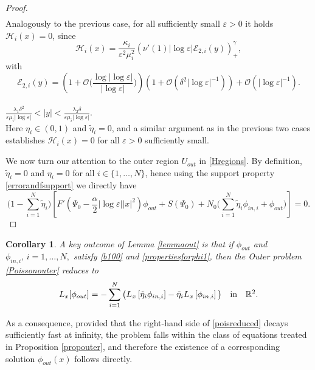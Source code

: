 \documentclass[11pt,reqno,a4paper]{amsart}
\numberwithin{equation}{section}
\newcommand{\R}{\mathbb{R}}
\newcommand{\ve}{\varepsilon}
\newtheorem{corollary}{Corollary}[section]
\begin{document}
\begin{proof}
\begin{equation*}
\begin{aligned}
\end{aligned}
\end{equation*}
 Analogously to the previous case, for all sufficiently small $\ve>0$ it holds $\mathcal{H}_i(x)=0$,
 since \[\mathcal{H}_i(x)=\frac{\kappa_i}{\ve^2\mu_i^2}\left(\nu'(1)|\log\ve|\mathcal{E}_{2,i}(y)\right)^{\gamma}_{+},\]
 with
 \[\mathcal{E}_{2,i}(y)=
 \left(1+\mathcal{O}\Big(\frac{\log|\log\ve|}{|\log\ve|}\Big)\right)\left(1+\mathcal{O}\left(\delta^2|\log\ve|^{-1}\right)\right) +\mathcal{O}\left(|\log\ve|^{-1}\right).\]
\\
 $\frac{\lambda_1\delta^2}{\ve\mu_i|\log\ve|} <|y| < \frac{\lambda_2\delta}{\ve\mu_i|\log\ve|}.$
\\
Here $\eta_{i}\in(0,1)$ and $\tilde{\eta}_i=0$, and a similar argument as in the previous two cases establishes $\mathcal{H}_i(x)=0$ for all $\ve>0$ sufficiently small.


We now turn our attention to the outer region $U_{out}$ in \eqref{Hregions}. By definition, $\tilde{\eta}_i= 0$ and $\eta_i=0$ for all $i\in\{1,\dots,N\}$, hence using the support property \eqref{errorandfsupport} we directly have
\begin{equation*}
\bigg(1-\sum_{i=1}^{N}\tilde{\eta}_i\bigg)\left[F'\left(\Psi_{0}-\frac{\alpha}{2}|\log\ve||x|^2\right)\phi_{out}+S\left(\Psi_{0}\right)+N_0\Big(\sum_{i=1}^{N}\tilde{\eta}_i\phi_{in,i}+\phi_{out}\Big)\right]=0.
\end{equation*}
\end{proof}
\begin{corollary}
A key outcome of Lemma \ref{lemmaout} is that if $\phi_{out}$ and $\phi_{in,i},\,i=1,\dots,N,$ satisfy \eqref{b100} and \eqref{propertiesforphi1}, then the Outer problem \eqref{Poissonouter} reduces to 
\begin{equation}\label{poisreduced}
L_{x}[\phi_{out}]=-\sum_{i=1}^{N}\big(L_{x}\left[\tilde{\eta}_i\phi_{in,i}\right]-\tilde{\eta}_i L_{x}\left[\phi_{in,i}\right]\big) \quad \textnormal{in} \quad \R^2.
\end{equation}
\end{corollary}
As a consequence, provided that the right-hand side of \eqref{poisreduced} decays sufficiently fast at infinity, the problem falls within the class of equations treated in Proposition \ref{propouter}, and therefore the existence of a corresponding solution $\phi_{out}(x)$ follows directly.
\end{document}
